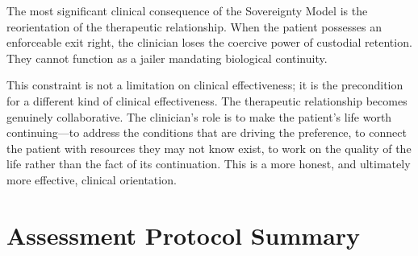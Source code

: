 \documentclass[11pt, letterpaper]{article}
\begin{document}
The most significant clinical consequence of the Sovereignty Model is the reorientation
of the therapeutic relationship. When the patient possesses an enforceable exit right,
the clinician loses the coercive power of custodial retention. They cannot function as
a jailer mandating biological continuity.

This constraint is not a limitation on clinical effectiveness; it is the precondition
for a different kind of clinical effectiveness. The therapeutic relationship becomes
genuinely collaborative. The clinician's role is to make the patient's life worth
continuing---to address the conditions that are driving the preference, to connect the
patient with resources they may not know exist, to work on the quality of the life
rather than the fact of its continuation. This is a more honest, and ultimately more
effective, clinical orientation.

\section{Assessment Protocol Summary}
\end{document}
